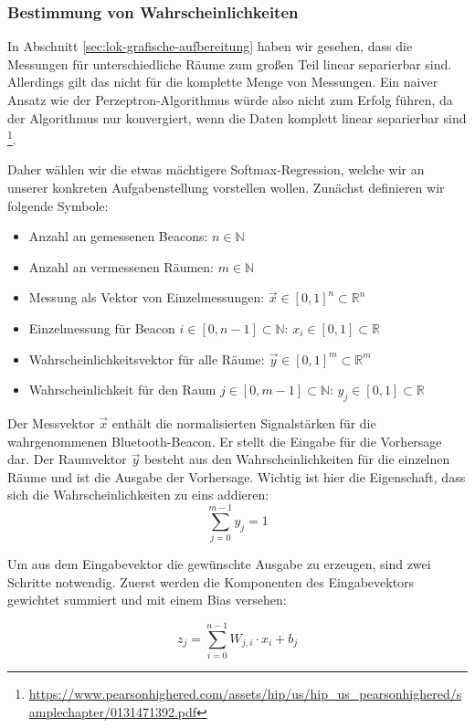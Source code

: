 \subsubsection{Bestimmung von Wahrscheinlichkeiten}

In Abschnitt \ref{sec:lok-grafische-aufbereitung} haben wir gesehen, dass die
Messungen für unterschiedliche Räume zum großen Teil linear separierbar sind.
Allerdings gilt das nicht für die komplette Menge von Messungen.
Ein naiver Ansatz wie der Perzeptron-Algorithmus würde also nicht zum Erfolg
führen, da der Algorithmus nur konvergiert, wenn die Daten komplett linear
separierbar sind
\footnote{\url{https://www.pearsonhighered.com/assets/hip/us/hip_us_pearsonhighered/samplechapter/0131471392.pdf}}.

Daher wählen wir die etwas mächtigere Softmax-Regression, welche wir an unserer
konkreten Aufgabenstellung vorstellen wollen.
Zunächst definieren wir folgende Symbole:
\begin{itemize}
	\item Anzahl an gemessenen Beacons: $n \in \mathbb{N}$
	\item Anzahl an vermessenen Räumen: $m \in \mathbb{N}$
	\item Messung als Vektor von Einzelmessungen: $ \vec{x} \in [0, 1]^n \subset \mathbb{R}^n $
	\item Einzelmessung für Beacon $i \in [0, n - 1] \subset \mathbb{N}$: $x_i \in [0, 1] \subset \mathbb{R}$
	\item Wahrscheinlichkeitsvektor für alle Räume: $ \vec{y} \in [0, 1]^m \subset \mathbb{R}^m$
	\item Wahrscheinlichkeit für den Raum $j \in [0, m - 1] \subset \mathbb{N}$:
		$ y_j \in [0, 1] \subset \mathbb{R} $ 
\end{itemize}

Der Messvektor $\vec{x}$ enthält die normalisierten Signalstärken für die wahrgenommenen
Bluetooth-Beacon. Er stellt die Eingabe für die Vorhersage dar. 
Der Raumvektor $\vec{y}$ besteht aus den Wahrscheinlichkeiten für die einzelnen Räume und
ist die Ausgabe der Vorhersage. Wichtig ist hier die Eigenschaft, dass sich die Wahrscheinlichkeiten
zu eins addieren:
$$ \sum_{j=0}^{m-1} y_j = 1 $$

Um aus dem Eingabevektor die gewünschte Ausgabe zu erzeugen, sind zwei Schritte notwendig.
Zuerst werden die Komponenten des Eingabevektors gewichtet summiert und mit einem Bias
versehen:

$$ z_j = \sum_{i=0}^{n-1} W_{j,i} \cdot x_i + b_j $$

